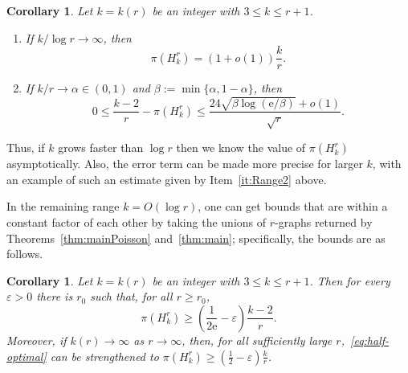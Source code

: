 \documentclass[12pt,a4paper]{article}
\numberwithin{equation}{section}
\newtheorem{corollary}[theorem]{Corollary}
\theoremstyle{definition}
\theoremstyle{remark}
\newcommand{\hide}[1]{{\color{DarkGreen}#1}}
\renewcommand{\hide}[1]{}
\newcommand{\me}{\mathrm{e}}
\begin{document}
\begin{corollary}\label{cor:applications}
	Let $k=k(r)$ be an integer with $3\le k\le r+1$.
	\begin{enumerate}[label=\textup{(\roman*)}]
\hide{		\item\label{it:Range0} If $k/\log r\to c\in(0,\infty)$, then
		\begin{equation*}
			1-24\left(c^{-1/2}+c^{-1}\right)+o(1)
			\le \frac{\pi(H_k^r)}{(k-2)/r}\le1.
		\end{equation*}
	}
		\item\label{it:Range1} If $k/\log r\to\infty$, then
		\begin{equation*}
			\pi(H_k^r)=(1+o(1))\frac{k}{r}.
		\end{equation*}
		\item\label{it:Range2} If $k/r\to\alpha\in(0,1)$ and $\beta:=\min\{\alpha,1-\alpha\}$, then
		\begin{equation*}
			0\le\frac{k-2}{r}-\pi(H_k^r)
			\le\frac{24\sqrt{\beta\log(\me /\beta)}+o(1)}{\sqrt r}.
		\end{equation*}
	\end{enumerate}
\end{corollary}


Thus, if $k$ grows faster than $\log r$ then we know the value of  $\pi(H_k^r)$ asymptotically.
Also, the error term can be made more precise for larger $k$, with an example of such an estimate given by Item~\ref{it:Range2} above. 




In the remaining range $k=O(\log r)$, one can get bounds that are within a constant factor of each other by taking the unions of $r$-graphs returned by Theorems~\ref{thm:mainPoisson} and~\ref{thm:main}; specifically, the bounds are as follows.



\begin{corollary}\label{cor:half-optimal}
	Let $k=k(r)$ be an integer with $3\le k\le r+1$. Then for every $\varepsilon>0$ there is $r_0$ such that, for all $r\ge r_0$, 
	\begin{equation}\label{eq:half-optimal}
		\pi(H_k^r)\ge \left(\frac1{2\me}-\varepsilon\right)\frac{k-2}{r}.
	\end{equation}
	Moreover, if $k(r)\to\infty$ as $r\to \infty$, then, for all sufficiently large $r$,~\eqref{eq:half-optimal} can be strengthened to $\pi(H_k^r)\ge(\frac12-\varepsilon)\frac{k}{r}$.
\end{corollary}
\end{document}
